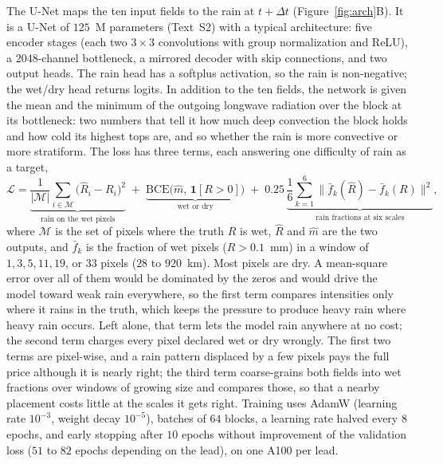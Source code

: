 \documentclass[draft]{agujournal2019}
\begin{document}
The U-Net maps the ten input fields to the rain at $t + \Delta t$
(Figure~\ref{fig:arch}B). It is a U-Net of $125$~M parameters (Text~S2)
with a typical architecture: five encoder stages (each two $3 \times 3$
convolutions with group normalization and ReLU), a $2048$-channel
bottleneck, a mirrored decoder with skip connections, and two output
heads. The rain head has a softplus activation, so the rain is
non-negative; the wet/dry head returns logits. In addition to the ten
fields, the network is given the mean and the minimum of the outgoing
longwave radiation over the block at its bottleneck: two numbers that
tell it how much deep convection the block holds and how cold its highest
tops are, and so whether the rain is more convective or more stratiform.
The loss has three terms, each answering one difficulty of rain as a
target,
\begin{equation}
\mathcal{L} =
\underbrace{\frac{1}{|\mathcal{M}|}\sum_{i \in \mathcal{M}}
  \big(\hat{R}_i - R_i\big)^2}_{\text{rain on the wet pixels}}
\;+\;
\underbrace{\mathrm{BCE}\big(\hat{m},\, \mathbf{1}[R > 0]\big)}_{\text{wet or dry}}
\;+\; 0.25\,
\underbrace{\frac{1}{6}\sum_{k=1}^{6}
  \big\| \bar{f}_k(\hat{R}) - \bar{f}_k(R) \big\|^2}_{\text{rain fractions at six scales}} ,
\label{eq:loss}
\end{equation}
where $\mathcal{M}$ is the set of pixels where the truth $R$ is wet, $\hat{R}$
and $\hat{m}$ are the two outputs, and $\bar{f}_k$ is the fraction of wet
pixels ($R > 0.1$~mm) in a window of $1, 3, 5, 11, 19$, or $33$ pixels
($28$ to $920$~km). Most pixels are dry. A mean-square error over all of
them would be dominated by the zeros and would drive the model toward
weak rain everywhere, so the first term compares intensities only where
it rains in the truth, which keeps the pressure to produce heavy rain
where heavy rain occurs. Left alone, that term lets the model rain
anywhere at no cost; the second term charges every pixel declared wet or
dry wrongly. The first two terms are pixel-wise, and a rain pattern
displaced by a few pixels pays the full price although it is nearly
right; the third term coarse-grains both fields into wet fractions over
windows of growing size and compares those, so that a nearby placement
costs little at the scales it gets right. Training uses AdamW
(learning rate $10^{-3}$, weight decay $10^{-5}$), batches of $64$
blocks, a learning rate halved every $8$ epochs, and early stopping after
$10$ epochs without improvement of the validation loss ($51$ to $82$
epochs depending on the lead), on one A100 per lead.
\end{document}
